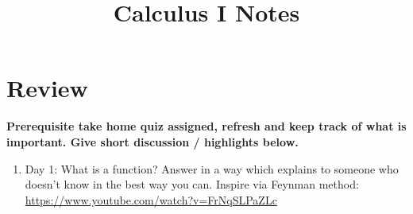 \documentclass{article}
\title{Calculus I Notes}
\date
\begin{document}
\maketitle
\large

\tableofcontents

\section{Review}
{\bf Prerequisite take home quiz assigned, refresh and keep track of what is important. Give short discussion / highlights below.}
\begin{enumerate}
\item Day 1: What is a function? Answer in a way which explains to someone who doesn't know in the best way you can. Inspire via Feynman method: 
\url{https://www.youtube.com/watch?v=FrNqSLPaZLc}


\end{enumerate}
\end{document}
